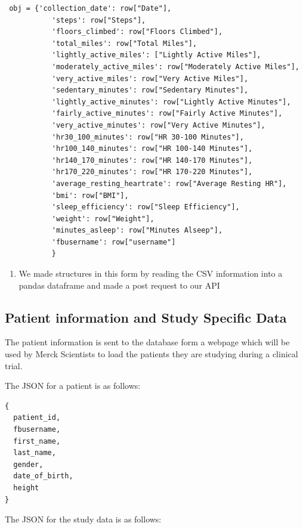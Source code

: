 \documentclass[]{book}
\providecommand{\tightlist}{%
  \setlength{\itemsep}{0pt}\setlength{\parskip}{0pt}}
\begin{document}
\begin{verbatim}
 obj = {'collection_date': row["Date"],
           'steps': row["Steps"],
           'floors_climbed': row["Floors Climbed"],
           'total_miles': row["Total Miles"],
           'lightly_active_miles': ["Lightly Active Miles"],
           'moderately_active_miles': row["Moderately Active Miles"],
           'very_active_miles': row["Very Active Miles"],
           'sedentary_minutes': row["Sedentary Minutes"],
           'lightly_active_minutes': row["Lightly Active Minutes"],
           'fairly_active_minutes': row["Fairly Active Minutes"],
           'very_active_minutes': row["Very Active Minutes"],
           'hr30_100_minutes': row["HR 30-100 Minutes"],
           'hr100_140_minutes': row["HR 100-140 Minutes"],
           'hr140_170_minutes': row["HR 140-170 Minutes"],
           'hr170_220_minutes': row["HR 170-220 Minutes"],
           'average_resting_heartrate': row["Average Resting HR"],
           'bmi': row["BMI"],
           'sleep_efficiency': row["Sleep Efficiency"],
           'weight': row["Weight"],
           'minutes_asleep': row["Minutes Alseep"],
           'fbusername': row["username"]
           }
\end{verbatim}

\begin{enumerate}
\def\labelenumi{\arabic{enumi}.}
\setcounter{enumi}{1}
\tightlist
\item
  We made structures in this form by reading the CSV information into a pandas dataframe and made a post request to our API
\end{enumerate}

\hypertarget{patient-information-and-study-specific-data}{%
\subsection{Patient information and Study Specific Data}\label{patient-information-and-study-specific-data}}

The patient information is sent to the database form a webpage which will be used by Merck Scientists to load the patients they are studying during a clinical trial.

The JSON for a patient is as follows:

\begin{verbatim}
{
  patient_id,
  fbusername,
  first_name,
  last_name,
  gender,
  date_of_birth,
  height
}
\end{verbatim}

The JSON for the study data is as follows:
\end{document}
